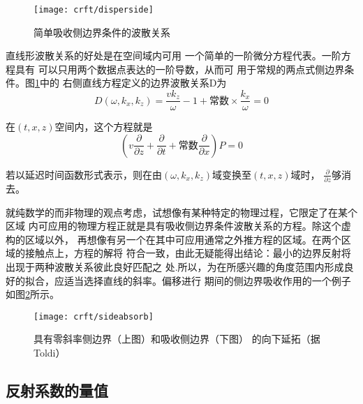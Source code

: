 \begin{figure}[H]
\centering
\texttt{[image: crft/disperside]}
\caption[disperside]{简单吸收侧边界条件的波散关系}
\label{fig:crft/disperside}
\end{figure}

直线形波散关系的好处是在空间域内可用
一个简单的一阶微分方程代表。一阶方程具有
可以只用两个数据点表达的一阶导数，从而可
用于常规的两点式侧边界条件。图\ref{fig:crft/disperside}中的
右侧直线方程定义的边界波散关系D为
\begin{equation}
D(\omega,k_x,k_z)=\frac{vk_z}{\omega}-1+\text{常数}\times \frac{k_x}{\omega}=0
\label{eq:ex4.4.1}
\end{equation}

在$(t,x,z)$空间内，这个方程就是
\begin{equation}
(v\frac{\partial}{\partial z}+
\frac{\partial}{\partial t}+
\text{常数}\frac{\partial}{\partial x})P=0
\label{eq:ex4.4.2}
\end{equation}

若以延迟时间函数形式表示，则在由$(\omega,k_x,k_z)$域变换至$(t,x,z)$域时， $\frac{\partial}{\partial z}$够消去。

就纯数学的而非物理的观点考虑，试想像有某种特定的物理过程，它限定了在某个区域
内可应用的物理方程正就是具有吸收侧边界条件波散关系的方程。除这个虚构的区域以外，
再想像有另一个在其中可应用通常之外推方程的区域。在两个区域的接触点上，方程的解将
符合一致，由此无疑能得出结论：最小的边界反射将出现于两种波散关系彼此良好匹配之
处.所以，为在所感兴趣的角度范围内形成良好的拟合，应适当选择直线的斜率。偏移进行
期间的侧边界吸收作用的一个例子如图\ref{fig:crft/sideabsorb}所示。

\begin{figure}[H]
\centering
\texttt{[image: crft/sideabsorb]}
\caption[sideabsorb]{具有零斜率侧边界（上图）和吸收侧边界（下图）
的向下延拓（据Toldi）}
\label{fig:crft/sideabsorb}
\end{figure}

\subsection{反射系数的量值}
\label{sec:4.4.5}

